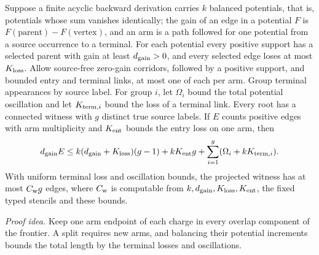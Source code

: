 \begin{lemma}\label{q:frontier}
Suppose a finite acyclic backward derivation carries \(k\) balanced
potentials, that is, potentials whose sum vanishes identically; the gain
of an edge in a potential \(F\) is \(F(\text{parent})-F(\text{vertex})\),
and an arm is a path followed for one potential from a source occurrence
to a terminal. For each potential every positive support has a selected
parent with gain at least \(d_{\rm gain}>0\), and every selected edge loses at
most \(K_{\rm loss}\). Allow source-free zero-gain corridors, followed by a
positive support, and bounded entry and terminal links, at most one
of each per arm. Group terminal appearances by source label. For group
\(i\), let \(\Omega_i\) bound the total potential oscillation and let
\(K_{{\rm term},i}\) bound the loss of a terminal link. Every root has a
connected witness with \(g\) distinct true source labels. If \(E\) counts
positive edges with arm multiplicity and \(K_{\rm ent}\) bounds the entry
loss on one arm, then
\[
 d_{\rm gain} E\le k(d_{\rm gain}+K_{\rm loss})(g-1)+kK_{\rm ent}g+
 \sum_{i=1}^g(\Omega_i+kK_{{\rm term},i}).
\]
With uniform terminal loss and oscillation bounds, the projected witness
has at most \(C_{\rm w}g\) edges, where \(C_{\rm w}\) is computable from
\(k,d_{\rm gain},K_{\rm loss},K_{\rm ent}\), the fixed typed stencils and these bounds.
\end{lemma}
\par\noindent\emph{Proof idea.} Keep one arm endpoint of each charge in every overlap component of the frontier. A split requires new arms, and balancing their potential increments bounds the total length by the terminal losses and oscillations.

